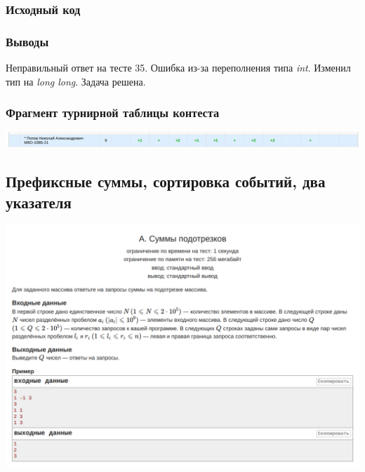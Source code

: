 \subsubsection*{Исходный код}


\subsubsection*{Выводы}
Неправильный ответ на тесте 35. Ошибка из-за переполнения типа \textit{int}. Изменил тип на \textit{long long}. Задача решена.
\newline

\subsubsection*{Фрагмент турнирной таблицы контеста}
\begin{center}
\includegraphics[width=\textwidth]{standings/Contest3.png}\newline\noindent
\end{center}


\subsection*{Префиксные суммы, сортировка событий, два указателя}

\begin{center}
\includegraphics[width=\textwidth]{statements/Contest4A.png}
\end{center}

